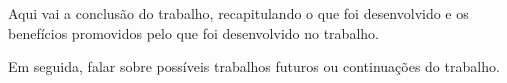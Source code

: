 \chapter*{}
\noindent
{}
\newline
\newline

Aqui vai a conclusão do trabalho, recapitulando o que foi desenvolvido e os benefícios promovidos pelo que foi desenvolvido no trabalho. 

Em seguida, falar sobre possíveis trabalhos futuros ou continuações do trabalho.
